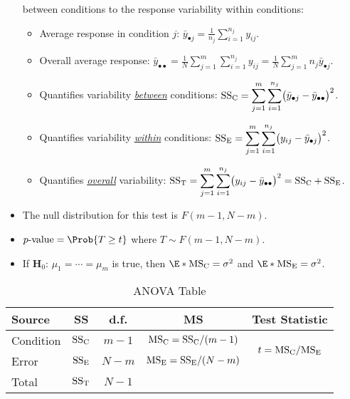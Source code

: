 \begin{itemize}
          between conditions to the response variability within conditions:
          \begin{itemize}
              \item Average response in condition $ j $: $ \displaystyle \bar{y}_{\bullet j}=\frac{1}{n_j} \sum_{i=1}^{n_j} y_{ij} $.
              \item Overall average response: $ \displaystyle \bar{y}_{\bullet\bullet}=\frac{1}{N} \sum_{j=1}^{m} \sum_{i=1}^{n_j} y_{ij}=\frac{1}{N} \sum_{j=1}^{m} n_j\bar{y}_{\bullet j} $.
              \item Quantifies variability \underline{\emph{between}} conditions:
                    $ \displaystyle \text{SS}_{\text{C}}=\sum_{j=1}^{m} \sum_{i=1}^{n_j} \bigl(\bar{y}_{\bullet j}-\bar{y}_{\bullet\bullet}\bigr)^2 $.
              \item Quantifies variability \underline{\emph{within}} conditions:
                    $ \displaystyle \text{SS}_{\text{E}}=\sum_{j=1}^{m} \sum_{i=1}^{n_j} \bigl(y_{ij}-\bar{y}_{\bullet j}\bigr)^2 $.
              \item Quantifies \underline{\emph{overall}} variability:
                    $ \displaystyle \text{SS}_{\text{T}}=\sum_{j=1}^{m} \sum_{i=1}^{n_j} \bigl(y_{ij}-\bar{y}_{\bullet\bullet}\bigr)^2=\text{SS}_{\text{C}}+\text{SS}_{\text{E}} $.
          \end{itemize}
    \item The null distribution for this test is $ F(m-1,N-m) $.
    \item $ p\text{-value}=\Prob{T\ge t} $ where $ T \sim F(m-1,N-m) $.
    \item If $ \mathbf{H}_0 $: $ \mu_1=\cdots=\mu_m $ is true, then $ \E*{\MSC}=\sigma^2 $ and $ \E*{\MSE}=\sigma^2 $.
\end{itemize}
\begin{table}[!htbp]
    \centering
    \caption{ANOVA Table}
    \begin{NiceTabular}{|l|c|c|c|c|}
        \toprule
        Source    & SS                     & d.f.    & MS                                                               & Test Statistic                                                   \\
        \midrule
        Condition & $ \text{SS}_{\text{C}} $ & $ m-1 $ & $ \text{MS}_{\text{C}}=\text{SS}_{\text{C}}/(m-1) $ &  \\
        Error     & $ \text{SS}_{\text{E}} $ & $ N-m $ & $ \text{MS}_{\text{E}}=\text{SS}_{\text{E}}/(N-m) $                                                               \\
        \midrule
        Total     & $ \text{SS}_{\text{T}} $ & $ N-1 $\\
        \bottomrule
    \end{NiceTabular}
\end{table}
